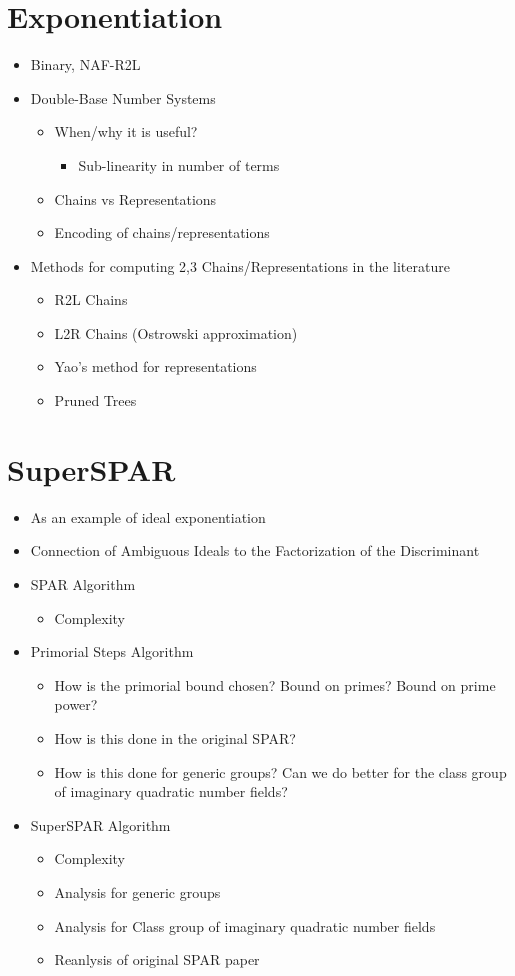 \documentclass[11pt, letterpaper]{article}
\theoremstyle{definition}
\begin{document}
\section{Exponentiation}
\begin{itemize}
\item Binary, NAF-R2L
\item Double-Base Number Systems
	\begin{itemize}
	\item When/why it is useful?
	\begin{itemize}
		\item Sub-linearity in number of terms
	\end{itemize}
	\item Chains vs Representations
	\item Encoding of chains/representations
	\end{itemize}
\item Methods for computing 2,3 Chains/Representations in the literature
	\begin{itemize}
	\item R2L Chains
	\item L2R Chains (Ostrowski approximation)
	\item Yao's method for representations
	\item Pruned Trees
	\end{itemize}
\end{itemize}


\bigbreak
\section{SuperSPAR}
\begin{itemize}
\item As an example of ideal exponentiation
\item Connection of Ambiguous Ideals to the Factorization of the Discriminant
\item SPAR Algorithm
	\begin{itemize}
		\item Complexity
	\end{itemize}
\item Primorial Steps Algorithm
	\begin{itemize}
	\item How is the primorial bound chosen?  Bound on primes? Bound on prime power?
	\item How is this done in the original SPAR?
	\item How is this done for generic groups?  Can we do better for the class group of imaginary quadratic number fields?
	\end{itemize}
\item SuperSPAR Algorithm
	\begin{itemize}
		\item Complexity
		\item Analysis for generic groups
		\item Analysis for Class group of imaginary quadratic number fields
		\item Reanlysis of original SPAR paper
	\end{itemize}
\end{itemize}
\end{document}
